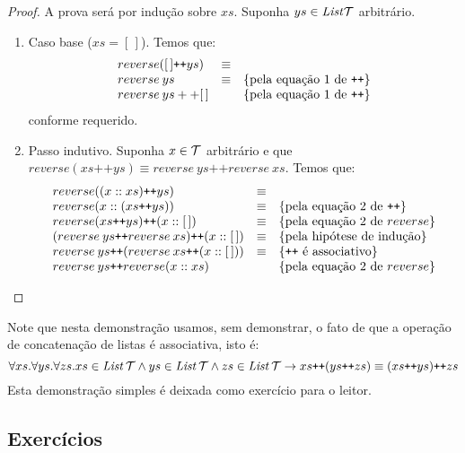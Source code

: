 \begin{proof}
A prova será por indução sobre $xs$. Suponha $ys \in \textit{List\/}\mathcal{T}$ arbitrário.
\begin{enumerate}
  \item Caso base ($xs = [\,]$). Temos que:
\[
\begin{array}{lcl}
reverse([\,] \texttt{++} ys) & \equiv & \\
reverse \: ys  & \equiv & \{\text{pela equação 1 de \texttt{++}}\} \\
reverse\: ys ++ [\,] &  & \{\text{pela equação 1 de \texttt{++}}\} \\
\end{array}
\]
conforme requerido.
\item Passo indutivo. Suponha $x\in\mathcal{T}$ arbitrário e que
  $reverse(xs \texttt{++} ys) \equiv reverse\: ys \texttt{++}
  reverse\: xs$. Temos que:
\[
\begin{array}{lcl}
reverse((x :: xs) \texttt{++} ys) & \equiv & \\
reverse(x :: (xs \texttt{++} ys)) & \equiv & \{\text{pela equação 2 de
\texttt{++}}\}\\
reverse(xs \texttt{++} ys) \texttt{++} (x :: [\,]) & \equiv &
\{\text{pela equação 2 de }reverse\}\\
(reverse\: ys \texttt{++} reverse\: xs) \texttt{++} (x :: [\,]) &
\equiv & \{\text{pela hipótese de indução}\} \\
reverse\: ys \texttt{++} (reverse\: xs \texttt{++} (x :: [\,])) &
\equiv & \{\texttt{++} \text{ é associativo}\} \\
reverse\: ys \texttt{++} reverse(x ::xs)  &
 & \{\text{pela equação 2 de }reverse\} \\
\end{array}
\]
\end{enumerate}
\end{proof}
Note que nesta demonstração usamos, sem demonstrar, o fato de que a
operação de concatenação de listas é associativa, isto é:
\[
\forall xs.\forall ys. \forall zs. xs \in \textit{List\/}\,\mathcal{T} \land ys \in \textit{List\/}\,\mathcal{T} \land zs \in
\textit{List\/}\,\mathcal{T} \to xs \texttt{++} (ys \texttt{++} zs) \equiv (xs
\texttt{++} ys) \texttt{++} zs
\]
Esta demonstração simples é deixada como exercício para o leitor.

\subsection{Exercícios}

